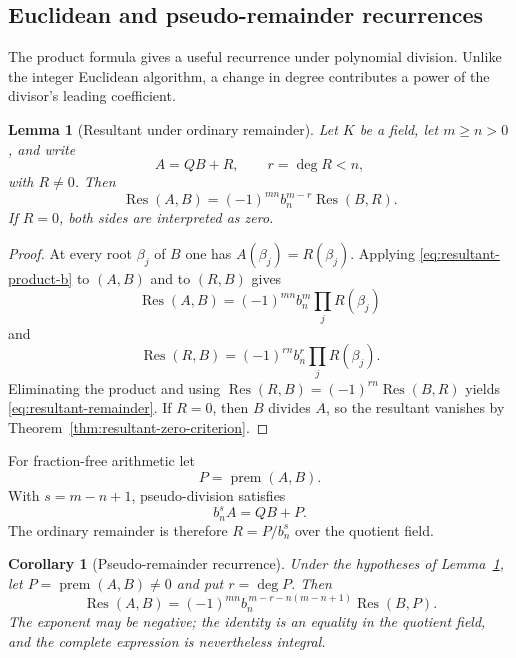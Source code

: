 \documentclass[11pt]{book}
\newtheorem{lemma}[theorem]{Lemma}
\newtheorem{corollary}[theorem]{Corollary}
\theoremstyle{definition}
\begin{document}
\subsection{Euclidean and pseudo-remainder recurrences}

The product formula gives a useful recurrence under polynomial division.
Unlike the integer Euclidean algorithm, a change in degree contributes a
power of the divisor's leading coefficient.

\begin{lemma}[Resultant under ordinary remainder]\label{lem:resultant-remainder}
Let $K$ be a field, let $m\ge n>0$, and write
\[
 A=QB+R,
 \qquad
 r=\deg R<n,
\]
with $R\ne0$.  Then
\begin{equation}\label{eq:resultant-remainder}
 \operatorname{Res}(A,B)
 =(-1)^{mn}b_n^{m-r}\operatorname{Res}(B,R).
\end{equation}
If $R=0$, both sides are interpreted as zero.
\end{lemma}

\begin{proof}
At every root $\beta_j$ of $B$ one has $A(\beta_j)=R(\beta_j)$.  Applying
\eqref{eq:resultant-product-b} to $(A,B)$ and to $(R,B)$ gives
\[
 \operatorname{Res}(A,B)
 =(-1)^{mn}b_n^m\prod_jR(\beta_j)
\]
and
\[
 \operatorname{Res}(R,B)
 =(-1)^{rn}b_n^r\prod_jR(\beta_j).
\]
Eliminating the product and using
$\operatorname{Res}(R,B)=(-1)^{rn}\operatorname{Res}(B,R)$ yields
\eqref{eq:resultant-remainder}.  If $R=0$, then $B$ divides $A$, so the
resultant vanishes by Theorem~\ref{thm:resultant-zero-criterion}.
\end{proof}

For fraction-free arithmetic let
\[
 P=\operatorname{prem}(A,B).
\]
With $s=m-n+1$, pseudo-division satisfies
\[
 b_n^sA=QB+P.
\]
The ordinary remainder is therefore $R=P/b_n^s$ over the quotient field.

\begin{corollary}[Pseudo-remainder recurrence]
\label{cor:resultant-pseudoremainder}
Under the hypotheses of Lemma~\ref{lem:resultant-remainder}, let
$P=\operatorname{prem}(A,B)\ne0$ and put $r=\deg P$.  Then
\begin{equation}\label{eq:resultant-pseudoremainder}
 \operatorname{Res}(A,B)
 =(-1)^{mn}
  b_n^{\,m-r-n(m-n+1)}
  \operatorname{Res}(B,P).
\end{equation}
The exponent may be negative; the identity is an equality in the quotient
field, and the complete expression is nevertheless integral.
\end{corollary}
\end{document}
